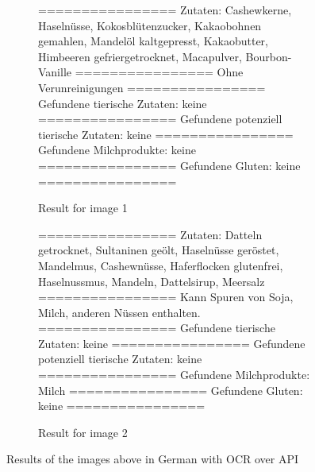 \documentclass[a4paper,11pt]{report}
\begin{document}
            \begin{figure}[h]
                \centering
                \begin{subfigure}{0.45\textwidth}
                    \centering
                    ================
                    Zutaten: Cashewkerne, Haselnüsse, Kokosblütenzucker, Kakaobohnen gemahlen, Mandelöl kaltgepresst, Kakaobutter, Himbeeren gefriergetrocknet, Macapulver, Bourbon-Vanille
                    ================
                    Ohne Verunreinigungen
                    ================
                    Gefundene tierische Zutaten: keine
                    ================
                    Gefundene potenziell tierische Zutaten: keine
                    ================
                    Gefundene Milchprodukte: keine
                    ================
                    Gefundene Gluten: keine
                    ================
                    \caption{Result for image 1}
                    \label{fig:text_test_image_1}
                \end{subfigure}
                \hfill
                \begin{subfigure}{0.45\textwidth}
                    \centering
                    ================
                    Zutaten: Datteln getrocknet, Sultaninen geölt, Haselnüsse geröstet, Mandelmus, Cashewnüsse, Haferflocken glutenfrei, Haselnussmus, Mandeln, Dattelsirup, Meersalz
                    ================
                    Kann Spuren von Soja, Milch, anderen Nüssen enthalten.
                    ================
                    Gefundene tierische Zutaten: keine
                    ================
                    Gefundene potenziell tierische Zutaten: keine
                    ================
                    Gefundene Milchprodukte: Milch
                    ================
                    Gefundene Gluten: keine
                    ================
                    \caption{Result for image 2}
                    \label{fig:text_test_image_2}
                \end{subfigure}
                \caption{Results of the images above in German with OCR over API}
                \label{fig:subsection-test-text}
            \end{figure}
\end{document}
